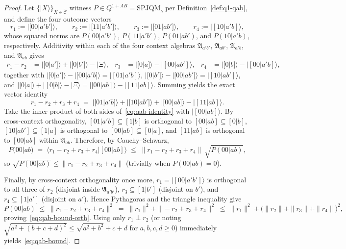 \documentclass[11pt,a4paper]{article}
\theoremstyle{definition}
\theoremstyle{remark}
\newcommand{\tcC}{\widetilde{\mathcal{C}}}
\newcommand{\EA}{\mathfrak{A}}
\newcommand{\SPJQMb}{\mathrm{SPJQM}_b}
\newcommand{\QAB}{Q^{1+AB}}
\newcommand{\ket}[1]{|#1\rangle}
\newcommand{\braket}[2]{\langle #1 | #2 \rangle}
\newcommand{\norm}[1]{\|#1\|}
\begin{document}
\begin{proof}
Let $\{\ket{X}\}_{X \in \tcC}$ witness $P \in \QAB = \SPJQMb$ per Definition~\ref{def:q1-qab}, and define the four outcome vectors
\[
r_1 := \ket{[00|a'b']}, \qquad r_2 := \ket{[11|a'b']}, \qquad r_3 := \ket{[01|ab']}, \qquad r_4 := \ket{[10|a'b]},
\]
whose squared norms are $P(00|a'b')$, $P(11|a'b')$, $P(01|ab')$, and $P(10|a'b)$, respectively. Additivity within each of the four context algebras $\EA_{a'b'}$, $\EA_{ab'}$, $\EA_{a'b}$, and $\EA_{ab}$ gives
\begin{align*}
r_1 - r_2 &= \ket{[0|a']} + \ket{[0|b']} - \ket{\Xi}, &
r_3 &= \ket{[0|a]} - \ket{[00|ab']}, &
r_4 &= \ket{[0|b]} - \ket{[00|a'b]},
\end{align*}
together with $\ket{[0|a']} - \ket{[00|a'b]} = \ket{[01|a'b]}$, $\ket{[0|b']} - \ket{[00|ab']} = \ket{[10|ab']}$, and $\ket{[0|a]} + \ket{[0|b]} - \ket{\Xi} = \ket{[00|ab]} - \ket{[11|ab]}$. Summing yields the exact vector identity
\begin{equation}\label{eq:qab-identity}
r_1 - r_2 + r_3 + r_4 \;=\; \ket{[01|a'b]} + \ket{[10|ab']} + \ket{[00|ab]} - \ket{[11|ab]}.
\end{equation}
Take the inner product of both sides of~\eqref{eq:qab-identity} with $\ket{[00|ab]}$. By cross-context orthogonality, $[01|a'b] \subseteq [1|b]$ is orthogonal to $[00|ab] \subseteq [0|b]$, $[10|ab'] \subseteq [1|a]$ is orthogonal to $[00|ab] \subseteq [0|a]$, and $[11|ab]$ is orthogonal to $[00|ab]$ within $\EA_{ab}$. Therefore, by Cauchy--Schwarz,
\[
P(00|ab) \;=\; \braket{r_1 - r_2 + r_3 + r_4}{[00|ab]} \;\le\; \norm{r_1 - r_2 + r_3 + r_4}\,\sqrt{P(00|ab)},
\]
so $\sqrt{P(00|ab)} \le \norm{r_1 - r_2 + r_3 + r_4}$ (trivially when $P(00|ab) = 0$).

Finally, by cross-context orthogonality once more, $r_1 = \ket{[00|a'b']}$ is orthogonal to all three of $r_2$ (disjoint inside $\EA_{a'b'}$), $r_3 \subseteq [1|b']$ (disjoint on $b'$), and $r_4 \subseteq [1|a']$ (disjoint on $a'$). Hence Pythagoras and the triangle inequality give
\[
P(00|ab) \;\le\; \norm{r_1 - r_2 + r_3 + r_4}^2
\;=\; \norm{r_1}^2 + \norm{-r_2 + r_3 + r_4}^2
\;\le\; \norm{r_1}^2 + \bigl(\norm{r_2} + \norm{r_3} + \norm{r_4}\bigr)^2,
\]
proving~\eqref{eq:qab-bound-orth}. Using only $r_1 \perp r_2$ (or noting $\sqrt{a^2 + (b+c+d)^2} \le \sqrt{a^2+b^2} + c + d$ for $a,b,c,d \ge 0$) immediately yields~\eqref{eq:qab-bound}.
\end{proof}
\end{document}
